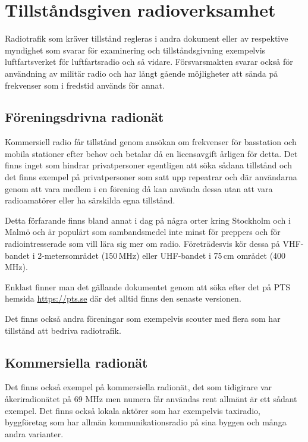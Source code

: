 \section{Tillståndsgiven radioverksamhet}

Radiotrafik som kräver tillstånd regleras i andra dokument eller av respektive
myndighet som svarar för examinering och tillståndsgivning exempelvis
luftfartsverket för luftfartsradio och så vidare. Försvarsmakten svarar också
för användning av militär radio och har långt gående möjligheter att sända på
frekvenser som i fredstid används för annat.

\subsection{Föreningsdrivna radionät}

Kommersiell radio får tillstånd genom ansökan om frekvenser för basstation och
mobila stationer efter behov och betalar då en licensavgift årligen för
detta. Det finns inget som hindrar privatpersoner egentligen att söka sådana
tillstånd och det finns exempel på privatpersoner som satt upp repeatrar och där
användarna genom att vara medlem i en förening då kan använda dessa utan att
vara radioamatörer eller ha särskilda egna tillstånd.

Detta förfarande finns bland annat i dag på några orter kring Stockholm och i
Malmö och är populärt som sambandsmedel inte minst för preppers och för
radiointresserade som vill lära sig mer om radio. Företrädesvis kör dessa på
VHF-bandet i 2-metersområdet (150\,MHz) eller UHF-bandet i 75\,cm området
(400\,MHz).

Enklast finner man det gällande dokumentet genom att söka efter det på PTS
hemsida \url{https://pts.se} där det alltid finns den senaste versionen.

Det finns också andra föreningar som exempelvis scouter med flera som har
tillstånd att bedriva radiotrafik.

\subsection{Kommersiella radionät}

Det finns också exempel på kommersiella radionät, det som tidigirare var
åkeriradionätet på 69 MHz men numera får användas rent allmänt är ett sådant
exempel. Det finns också lokala aktörer som har exempelvis taxiradio,
byggföretag som har allmän kommunikationsradio på sina byggen och många andra
varianter.

